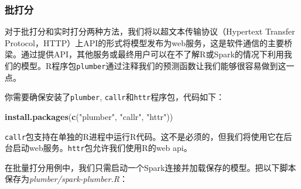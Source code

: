\documentclass[
]{article}
\newenvironment{Shaded}{\begin{snugshade}}{\end{snugshade}}
\newcommand{\CommentTok}[1]{\textcolor[rgb]{0.56,0.35,0.01}{\textit{#1}}}
\newcommand{\ControlFlowTok}[1]{\textcolor[rgb]{0.13,0.29,0.53}{\textbf{#1}}}
\newcommand{\DataTypeTok}[1]{\textcolor[rgb]{0.13,0.29,0.53}{#1}}
\newcommand{\KeywordTok}[1]{\textcolor[rgb]{0.13,0.29,0.53}{\textbf{#1}}}
\newcommand{\NormalTok}[1]{#1}
\newcommand{\OperatorTok}[1]{\textcolor[rgb]{0.81,0.36,0.00}{\textbf{#1}}}
\newcommand{\OtherTok}[1]{\textcolor[rgb]{0.56,0.35,0.01}{#1}}
\newcommand{\StringTok}[1]{\textcolor[rgb]{0.31,0.60,0.02}{#1}}
\begin{document}
\hypertarget{ux6279ux6253ux5206}{%
\subsubsection{批打分}\label{ux6279ux6253ux5206}}

对于批打分和实时打分两种方法，我们将以超文本传输协议（Hypertext Transfer
Protocol，HTTP）上API的形式将模型发布为web服务，这是软件通信的主要桥梁。通过提供API，其他服务或最终用户可以在不了解R或Spark的情况下利用我们的模型。R程序包\texttt{plumber}通过注释我们的预测函数让我们能够很容易做到这一点。

你需要确保安装了\texttt{plumber},
\texttt{callr}和\texttt{httr}程序包，代码如下：

\begin{Shaded}
\begin{Highlighting}[]
\KeywordTok{install.packages}\NormalTok{(}\KeywordTok{c}\NormalTok{(}\StringTok{"plumber"}\NormalTok{, }\StringTok{"callr"}\NormalTok{, }\StringTok{"httr"}\NormalTok{))}
\end{Highlighting}
\end{Shaded}

\texttt{callr}包支持在单独的R进程中运行R代码。这不是必须的，但我们将使用它在后台启动web服务。\texttt{httr}包允许我们使用R的web
api。

在批量打分用例中，我们只需启动一个Spark连接并加载保存的模型。把以下脚本保存为\emph{plumber/spark-plumber.R}：

\begin{Shaded}
\end{Shaded}
\end{document}
